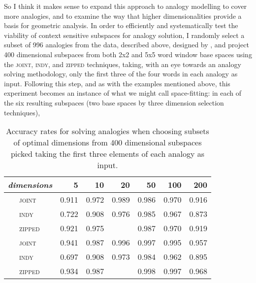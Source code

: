 So I think it makes sense to expand this approach to analogy modelling to cover more analogies, and to examine the way that higher dimensionalities provide a basis for geometric analysis.  In order to efficiently and systematically test the viability of context sensitive subspaces for analogy solution, I randomly select a subset of 996 analogies from the data, described above, designed by \cite{MikolovEA2013b}, and project 400 dimensional subspaces from both 2x2 and 5x5 word window base spaces using the \textsc{joint}, \textsc{indy}, and \textsc{zipped} techniques, taking, with an eye towards an analogy solving methodology, only the first three of the four words in each analogy as input.  Following this step, and as with the examples mentioned above, this experiment becomes an instance of what we might call space-fitting: in each of the six resulting subspaces (two base spaces by three dimension selection techniques), 

\begin{table}
\centering
\begin{tabular}{clrrrrrr}
\hline
\multicolumn{2}{l}{\emph{dimensions}} & 5 & 10 & 20 & 50 & 100 & 200 \\
\hline
\parbox[t]{2mm}{} & \textsc{joint} & 0.911 & 0.972 & 0.989 & 0.986 & 0.970 & 0.916 \\
& \textsc{indy} & 0.722 & 0.908 & 0.976 & 0.985 & 0.967 & 0.873 \\
& \textsc{zipped} & 0.921 & 0.975 &  & 0.987 & 0.970 & 0.919 \\
\hline
\parbox[t]{2mm}{} & \textsc{joint} & 0.941 & 0.987 & 0.996 & 0.997 & 0.995 & 0.957 \\
& \textsc{indy} & 0.697 & 0.908 & 0.973 & 0.984 & 0.962 & 0.895 \\
& \textsc{zipped} & 0.934 & 0.987 &  & 0.998 & 0.997 & 0.968 \\
\hline
\end{tabular}
\caption[Finding Spaces for Known Analogies]{Accuracy rates for solving analogies when choosing subsets of optimal dimensions from 400 dimensional subspaces picked taking the first three elements of each analogy as input.}
\label{tab:knowns}
\end{table}

